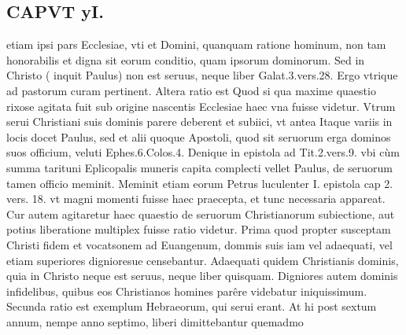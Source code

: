 \documentclass{article}
\begin{document}
\begin{pages}
\section*{CAPVT  yI. }
\marginpar{[ p.411 ]}\pstart etiam ipsi pars Ecclesiae, vti et Domini, quanquam ratione hominum, non tam honorabilis et digna sit eorum conditio, quam ipsorum dominorum. Sed in Christo ( inquit Paulus) non est seruus, neque liber Galat.3.vers.28. Ergo vtrique ad pastorum curam pertinent.  \pend\pstart Altera ratio est Quod si qua maxime quaestio rixose agitata fuit sub origine nascentis Ecclesiae haec vna fuisse videtur. Vtrum serui Christiani suis dominis parere deberent et subiici, vt antea Itaque variis in locis docet Paulus, sed et alii quoque Apostoli, quod sit seruorum erga dominos suos officium, veluti Ephes.6.Colos.4. Denique in epistola ad Tit.2.vers.9. vbi cùm summa tarituni Eplicopalis muneris capita complecti vellet Paulus, de seruorum tamen officio meminit. Meminit etiam eorum Petrus luculenter I. epistola cap 2. vers. 18. vt magni momenti fuisse haec praecepta, et tunc necessaria appareat.  \pend\pstart Cur autem agitaretur haec quaestio de seruorum Christianorum subiectione, aut potius liberatione multiplex fuisse ratio videtur.  \pend\pstart Prima quod propter susceptam Christi fidem et vocatsonem ad Euangenum, dommis suis iam vel adaequati, vel etiam superiores dignioresue censebantur. Adaequati quidem Christianis dominis, quia in Christo neque est seruus, neque liber quisquam. Digniores autem dominis infidelibus, quibus eos Christianos homines parêre videbatur iniquissimum.  \pend\pstart Secunda ratio est exemplum Hebraeorum, qui serui erant. At hi post sextum annum, nempe anno septimo, liberi dimittebantur quemadmo\pend

\end{pages}
\end{document}

